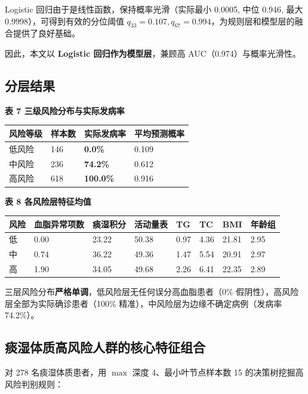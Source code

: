 \documentclass{MathorCupmodeling}
\begin{document}
Logistic 回归由于是线性函数，保持概率光滑（实际最小 0.0005, 中位 0.946, 最大 0.9998），可得到有效的分位阈值 \(q_{33} = 0.107, q_{67} = 0.994\)，为规则层和模型层的融合提供了良好基础。

因此，本文以 \textbf{Logistic 回归作为模型层}，兼顾高 AUC（0.974）与概率光滑性。

\subsection{分层结果}\label{ux5206ux5c42ux7ed3ux679c}

\textbf{表 7 三级风险分布与实际发病率}

\begin{longtable}[]{@{}llll@{}}
\toprule\noalign{}
风险等级 & 样本数 & 实际发病率 & 平均预测概率 \\
\midrule\noalign{}
\endhead
\bottomrule\noalign{}
\endlastfoot
低风险 & 146 & \textbf{0.0\%} & 0.109 \\
中风险 & 236 & \textbf{74.2\%} & 0.612 \\
高风险 & 618 & \textbf{100.0\%} & 0.916 \\
\end{longtable}

\textbf{表 8 各风险层特征均值}

\begin{longtable}[]{@{}llllllll@{}}
\toprule\noalign{}
风险 & 血脂异常项数 & 痰湿积分 & 活动量表 & TG & TC & BMI & 年龄组 \\
\midrule\noalign{}
\endhead
\bottomrule\noalign{}
\endlastfoot
低 & 0.00 & 23.22 & 50.38 & 0.97 & 4.36 & 21.81 & 2.95 \\
中 & 0.74 & 36.22 & 49.36 & 1.47 & 5.54 & 20.91 & 2.97 \\
高 & 1.90 & 34.05 & 49.68 & 2.26 & 6.41 & 22.35 & 2.89 \\
\end{longtable}

三层风险分布\textbf{严格单调}，低风险层无任何误分高血脂患者（0\% 假阴性），高风险层全部为实际确诊患者（100\% 精准），中风险层为边缘不确定病例（发病率 74.2\%）。

\subsection{痰湿体质高风险人群的核心特征组合}\label{ux75f0ux6e7fux4f53ux8d28ux9ad8ux98ceux9669ux4ebaux7fa4ux7684ux6838ux5fc3ux7279ux5f81ux7ec4ux5408}

对 278 名痰湿体质患者，用 \(\max\) 深度 4、最小叶节点样本数 15 的决策树挖掘高风险判别规则：
\end{document}
